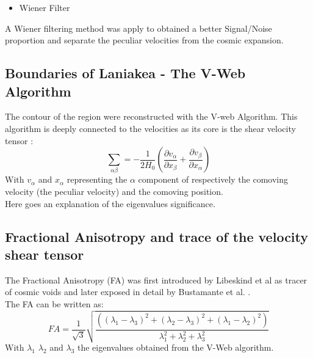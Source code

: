 \documentclass[12pt]{article}
\begin{document}
\begin{itemize}
\item Wiener Filter
\end{itemize}
A Wiener filtering method was apply to obtained a better Signal/Noise proportion and separate the peculiar velocities from the cosmic expansion\cite{zaroubi_wiener_1995}.\\





\subsection{Boundaries of Laniakea - The V-Web Algorithm}
\label{sec:v_web}
The contour of the region were reconstructed with
 the V-web Algorithm. 
This algorithm is deeply
  connected to the velocities as its core is the
   shear velocity tensor \cite{hoffman_kinematic_2012}:\\
\[
\sum_{\alpha\beta} = -\frac{1}{2 H_0} \left( \frac{\partial v_{\alpha}}{\partial x_{\beta}} + \frac{\partial v_{\beta}}{\partial x_{\alpha}} \right)
\]
With $v_{\alpha}$ and $x_{\alpha}$ representing the $\alpha$ component of respectively the comoving velocity (the peculiar velocity) and the comoving position.  \\

Here goes an explanation of the eigenvalues significance.





\subsection{Fractional Anisotropy and trace of the velocity shear tensor}
\label{sec:FA_trace}
The Fractional Anisotropy (FA) was first introduced by Libeskind et al \cite{libeskind_velocity_2013} as tracer of cosmic voids and later exposed in detail by Bustamante et al. \cite{bustamante_tensor_2015}.\\
The FA can be written as:
\[
FA = \frac{1}{\sqrt{3}} \sqrt{\frac{( \left( \lambda_1 - \lambda_3 \right)^2 + \left( \lambda_2 - \lambda_3 \right)^2 + \left( \lambda_1 - \lambda_2 \right)^2  )}{\lambda^{2}_1 + \lambda^{2}_2 + \lambda^{2}_3}} 
\]
With $\lambda_1$ $\lambda_2$ and $\lambda_3$ the eigenvalues obtained from the V-Web algorithm.
\end{document}
